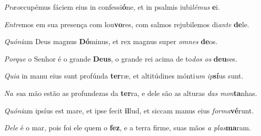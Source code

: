 \begin{greenumerate}
  \setcounter{enumi}{1}


  \item \textit{Præo}ccupémus fáciem eius in confessi\textbf{ó}ne, {\GreStar} et in psalmis iubi\textit{lémus} \textbf{e}i. 

  \switchcolumn\setcounter{enumi}{1}

  \item \textit{Entre}mos em sua presença com lou\textbf{vo}res, {\GreStar} com salmos rejubilemos di\textit{ante} \textbf{de}le. 

  \switchcolumn*


  \item \textit{Quóni}am Deus magnus \textbf{Dó}minus, {\GreStar} et rex magnus super \textit{omnes} \textbf{de}os. 

  \switchcolumn%

  \item \textit{Porque}  o Senhor é o grande \textbf{Deus}, {\GreStar} o grande rei acima de to\textit{dos os} \textbf{deu}ses. 

  \switchcolumn*


  \item \textit{Quia} in manu eius sunt profúnda \textbf{ter}ræ, {\GreStar} et altitúdines mónti\textit{um ip}\textbf{sí}us sunt. 

  \switchcolumn%

  \item \textit{Na su}a mão estão as profundezas da \textbf{ter}ra, {\GreStar} e dele são as alturas \textit{das mon}\textbf{ta}nhas. 

  \switchcolumn*


  \item \textit{Quóni}am ipsíus est mare, et ipse fecit \textbf{il}lud, {\GreStar} et siccam manus eius \textit{forma}\textbf{vé}runt. 

  \switchcolumn%

  \item \textit{Dele} é o mar, pois foi ele quem o \textbf{fez}, {\GreStar} e a terra firme, suas mãos \textit{a plas}\textbf{ma}ram. 

  \switchcolumn*


\end{greenumerate}
